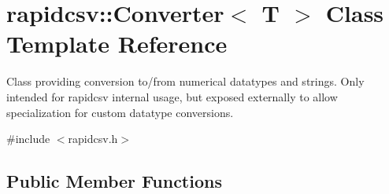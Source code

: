 \hypertarget{classrapidcsv_1_1Converter}{}\section{rapidcsv\+:\+:Converter$<$ T $>$ Class Template Reference}
\label{classrapidcsv_1_1Converter}


Class providing conversion to/from numerical datatypes and strings. Only intended for rapidcsv internal usage, but exposed externally to allow specialization for custom datatype conversions.  




{\ttfamily \#include $<$rapidcsv.\+h$>$}

\subsection*{Public Member Functions}
